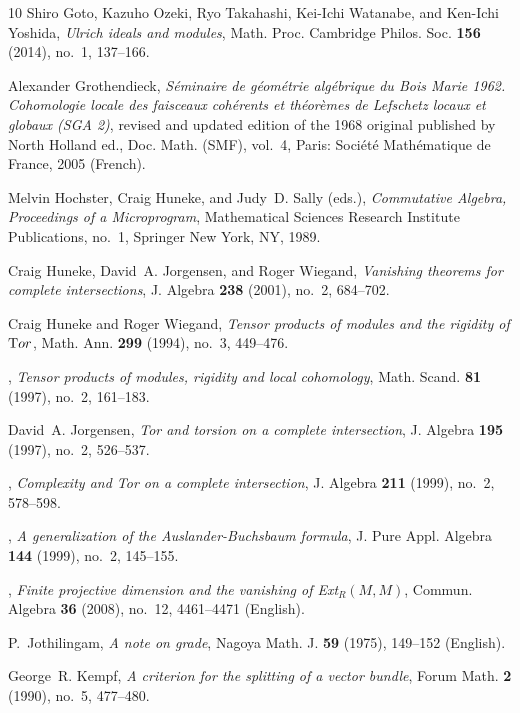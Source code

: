 \documentclass[11pt]{amsart}
\theoremstyle{definition}
\theoremstyle{definition}
\numberwithin{equation}{section}
\begin{document}
\begin{thebibliography}{10}
Shiro Goto, Kazuho Ozeki, Ryo Takahashi, Kei-Ichi Watanabe, and Ken-Ichi
  Yoshida, \emph{Ulrich ideals and modules}, Math. Proc. Cambridge Philos. Soc.
  \textbf{156} (2014), no.~1, 137--166.

Alexander Grothendieck, \emph{S{\'e}minaire de g{\'e}om{\'e}trie alg{\'e}brique
  du {Bois} {Marie} 1962. {Cohomologie} locale des faisceaux coh{\'e}rents et
  th{\'e}or{\`e}mes de {Lefschetz} locaux et globaux ({SGA} 2)}, revised and
  updated edition of the 1968 original published by {North} {Holland} ed., Doc.
  Math. (SMF), vol.~4, Paris: Soci{\'e}t{\'e} Math{\'e}matique de France, 2005
  (French).

Melvin Hochster, Craig Huneke, and Judy~D. Sally (eds.), \emph{Commutative
  {A}lgebra, {P}roceedings of a {M}icroprogram}, Mathematical Sciences Research
  Institute Publications, no.~1, Springer New York, NY, 1989.

Craig Huneke, David~A. Jorgensen, and Roger Wiegand, \emph{Vanishing theorems
  for complete intersections}, J. Algebra \textbf{238} (2001), no.~2, 684--702.

Craig Huneke and Roger Wiegand, \emph{Tensor products of modules and the
  rigidity of {${\textrm Tor}$}}, Math. Ann. \textbf{299} (1994), no.~3,
  449--476.

\bysame, \emph{Tensor products of modules, rigidity and local cohomology},
  Math. Scand. \textbf{81} (1997), no.~2, 161--183.

David~A. Jorgensen, \emph{Tor and torsion on a complete intersection}, J.
  Algebra \textbf{195} (1997), no.~2, 526--537.

\bysame, \emph{Complexity and {T}or on a complete intersection}, J. Algebra
  \textbf{211} (1999), no.~2, 578--598.

\bysame, \emph{A generalization of the {A}uslander-{B}uchsbaum formula}, J.
  Pure Appl. Algebra \textbf{144} (1999), no.~2, 145--155.

\bysame, \emph{Finite projective dimension and the vanishing of {Ext}{{\(_R(M,
  M)\)}}}, Commun. Algebra \textbf{36} (2008), no.~12, 4461--4471 (English).

P.~Jothilingam, \emph{A note on grade}, Nagoya Math. J. \textbf{59} (1975),
  149--152 (English).

George~R. Kempf, \emph{A criterion for the splitting of a vector bundle}, Forum
  Math. \textbf{2} (1990), no.~5, 477--480.


\end{thebibliography}
\end{document}
